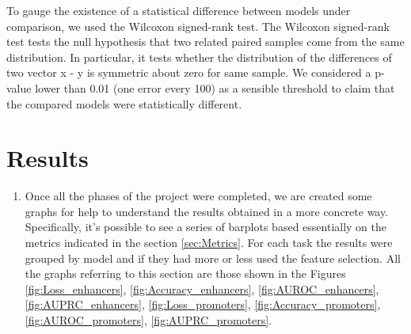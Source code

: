 \documentclass{article}
\begin{document}
\noindent
To gauge the existence of a statistical difference between models under comparison, we used the Wilcoxon signed-rank test. The Wilcoxon signed-rank \cite{wilcoxon} test tests the null hypothesis that two related paired samples come from the same distribution. In particular, it tests whether the distribution of the differences of two vector x - y is symmetric about zero for same sample. We considered a p-value lower than 0.01 (one error every 100) as a sensible threshold to claim that the compared models were statistically different.  

\section{Results}
\label{sec:Results}

\begin{enumerate}
    \item Once all the phases of the project were completed, we are created some graphs for help to understand the results obtained in a more concrete way. Specifically, it's possible to see a series of barplots based essentially on the metrics indicated in the section \ref{sec:Metrics}. For each task the results were grouped by model and if they had more or less used the feature selection.
    All the graphs referring to this section are those shown in the Figures \ref{fig:Loss_enhancers}, \ref{fig:Accuracy_enhancers}, \ref{fig:AUROC_enhancers}, \ref{fig:AUPRC_enhancers}, \ref{fig:Loss_promoters}, \ref{fig:Accuracy_promoters}, \ref{fig:AUROC_promoters}, \ref{fig:AUPRC_promoters}.
    

\end{enumerate}
\end{document}
